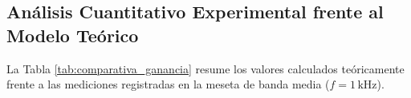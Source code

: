 \documentclass[10pt,a4paper]{article}
\begin{document}
\subsection{Análisis Cuantitativo Experimental frente al Modelo Teórico}

La Tabla \ref{tab:comparativa_ganancia} resume los valores calculados teóricamente frente a las mediciones registradas en la meseta de banda media ($f = 1\,\text{kHz}$).

\begin{table}[H]
    \centering
    \caption{Comparación de ganancia teórica vs experimental a $1\,\text{kHz}$}
    \label{tab:comparativa_ganancia}
\end{table}
\end{document}

